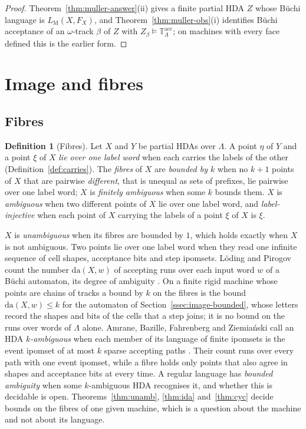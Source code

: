 \documentclass{lmcs}
\theoremstyle{definition}
\newtheorem{definition}[theorem]{Definition}
\theoremstyle{remark}
\newcommand{\Tt}{\mathbb{T}}
\providecommand{\LM}[1]{L_{\mathrm{M}}(#1)}
\providecommand{\Tacc}{\Tt^{\mathrm{acc}}_{\Lambda}}
\begin{document}
\begin{proof}
Theorem~\ref{thm:muller-answer}(ii) gives a finite partial HDA $Z$ whose B\"uchi language is $\LM{X,F_X}$, and
Theorem~\ref{thm:muller-obs}(i) identifies B\"uchi acceptance of an $\omega$-track $\beta$ of $Z$ with
$Z_\beta\models\Tacc$; on machines
with every face defined this is the earlier form.
\end{proof}

\section{Image and fibres}\label{sec:image}

\subsection{Fibres}\label{ssec:image-fibres}

\begin{definition}[Fibres]\label{def:fibres}\label{def:fibres-carry}
Let $X$ and $Y$ be partial HDAs over $\Lambda$. A point $\eta$ of $Y$ and a point $\xi$ of $X$ \emph{lie over one
label word} when each carries the labels of the other (Definition~\ref{def:carries}). The
\emph{fibres} of $X$ are \emph{bounded by $k$} when no $k+1$ points of $X$ that are pairwise \emph{different},
that is unequal as sets of prefixes, lie pairwise over one label word; $X$ is
\emph{finitely ambiguous} when some $k$ bounds them. $X$ is \emph{ambiguous} when
two different points of $X$ lie over one label word, and \emph{label-injective} when each
point of $X$ carrying the labels of a point $\xi$ of $X$ is $\xi$.
\end{definition}

$X$ is \emph{unambiguous} when its fibres are bounded by $1$, which holds exactly when $X$ is not
ambiguous. Two points lie over one label word when they read one infinite
sequence of cell shapes, acceptance bits and step ipomsets. L\"oding and Pirogov count the number
$\mathrm{da}(X,w)$ of accepting runs over each input word $w$ of a B\"uchi automaton, its degree of ambiguity
\cite{LP18}. On a finite rigid machine whose points are chains of
tracks a bound by $k$ on the fibres is the bound $\mathrm{da}(X,w)\leq k$ for the automaton of Section~\ref{ssec:image-bounded}, whose letters record the shapes and
bits of the cells that a step joins; it is no bound on the runs over words of $\Lambda$ alone. Amrane, Bazille,
Fahrenberg and Ziemia\'nski call an HDA \emph{$k$-ambiguous} when each member of its language of finite ipomsets is
the event ipomset of at most $k$ sparse accepting paths
\cite{ABFZ23}. Their count runs over every path with one event
ipomset, while a fibre holds only points that also agree in shapes and acceptance bits at every time. A regular
language has \emph{bounded ambiguity} when some $k$-ambiguous HDA recognises it,
and whether this is decidable is open. Theorems~\ref{thm:unamb}, \ref{thm:ida} and~\ref{thm:cyc}
decide bounds on the fibres of one given machine, which is a question about the machine and not about its language.
\end{document}
